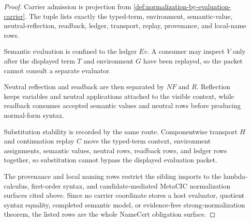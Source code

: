 \begin{proof}
Carrier admission is projection from \autoref{def:normalization-by-evaluation-carrier}. The tuple lists exactly the typed-term, environment, semantic-value, neutral-reflection, readback, ledger, transport, replay, provenance, and local-name rows.

Semantic evaluation is confined to the ledger $Ev$. A consumer may inspect $V$ only after the displayed term $T$ and environment $G$ have been replayed, so the packet cannot consult a separate evaluator.

Neutral reflection and readback are then separated by $NF$ and $R$. Reflection keeps variables and neutral applications attached to the visible context, while readback consumes accepted semantic values and neutral rows before producing normal-form syntax.

Substitution stability is recorded by the same route. Componentwise transport $H$ and continuation replay $C$ move the typed-term context, environment assignments, semantic values, neutral rows, readback rows, and ledger rows together, so substitution cannot bypass the displayed evaluation packet.

The provenance and local naming rows restrict the sibling imports to the lambda-calculus, first-order syntax, and candidate-mediated MetaCIC normalization surfaces cited above. Since no carrier coordinate stores a host evaluator, quotient syntax equality, completed semantic model, or evidence-free strong-normalization theorem, the listed rows are the whole NameCert obligation surface.
\end{proof}



